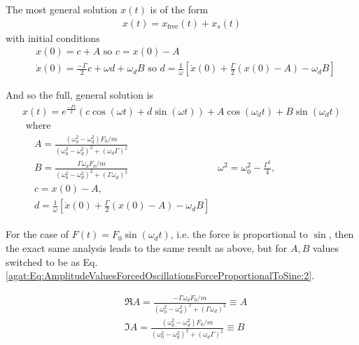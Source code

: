 The most general solution $x(t)$ is of the form
\[
\begin{gathered}
x(t) = x_{\text{free}}(t) + x_s(t)
\end{gathered}
\]
with initial conditions
\[
\begin{aligned}
& x(0) = c + A \text{ so } c = x(0) - A \\
& \dot{x}(0) = \frac{-\Gamma}{2} c + \omega d + \omega_d B \text{ so } d = \frac{1}{\omega} \left[ \dot{x}(0) + \frac{\Gamma}{2} (x(0) - A) - \omega_d B \right]
\end{aligned}
\]

And so the full, general solution is 
\begin{equation}
\begin{gathered}
x(t) = e^{\frac{-\Gamma t}{2} } (c\cos{(\omega t)} + d \sin{ (\omega t)} ) + A \cos{ (\omega_d t)} + B \sin{(\omega_d t)} \\
\text{ where } \\
\begin{aligned}
& A = \frac{ (\omega_0^2 - \omega_d^2) F_0 / m }{ (\omega_0^2 - \omega_d^2)^2 + (\omega_d \Gamma)^2 } \\
& B = \frac{ \Gamma \omega_d F_0 / m }{ (\omega_0^2 - \omega_d^2)^2 + (\Gamma \omega_d)^2 }
& \omega^2 = \omega_0^2 - \frac{\Gamma^2}{4}, \\
& c = x(0) - A, \\
& d = \frac{1}{\omega} \left[ \dot{x}(0) + \frac{\Gamma}{2} (x(0) - A) - \omega_d B \right]
\end{aligned}
\end{gathered}
\end{equation}

For the case of $F(t) = F_0 \sin{(\omega_d t)}$, i.e. the force is proportional to $\sin$, then the exact same analysis leads to the same result as above, but for $A,B$ values switched to be as Eq. \ref{agat:Eq:AmplitudeValuesForcedOscillationsForceProportionalToSine:2}.

\[
\begin{aligned}
& \Re{A} = \frac{ -\Gamma \omega_d F_0 /m }{ (\omega_0^2 - \omega_d^2)^2 + (\Gamma \omega_d )^2 } \equiv A \\
& \Im{A} = \frac{ (\omega_0^2 - \omega_d^2) F_0/m }{(\omega_0^2 - \omega_d^2)^2 + (\omega_d \Gamma)^2} \equiv B 
\end{aligned}
\]

